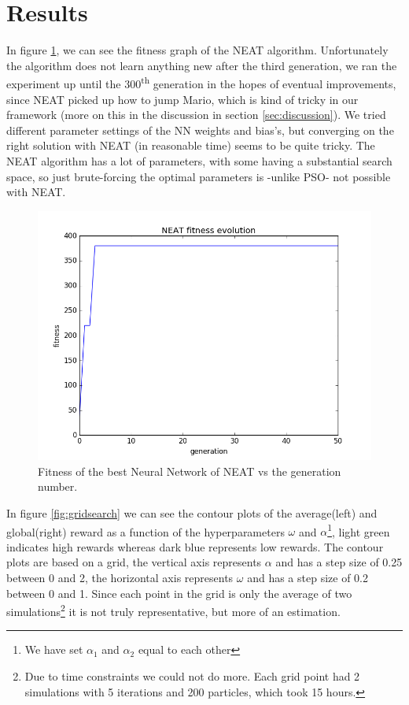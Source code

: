 \documentclass[]{article}
\begin{document}
\section{Results}
In figure \ref{fig:neat_fitness}, we can see the fitness graph of the NEAT algorithm. Unfortunately the algorithm does not learn anything new after the third generation, we ran the experiment up until the 300\textsuperscript{th} generation in the hopes of eventual improvements, since NEAT picked up how to jump Mario, which is kind of tricky in our framework (more on this in the discussion in section \ref{sec:discussion}). We tried different parameter settings of the NN weights and bias's, but converging on the right solution with NEAT (in reasonable time) seems to be quite tricky. The NEAT algorithm has a lot of parameters, with some having a substantial search space, so just brute-forcing the optimal parameters is -unlike PSO- not possible with NEAT.
\begin{figure}[h]
    \centering
    \includegraphics[width=0.8\linewidth]{images/neat_fitness.png}
    \caption{Fitness of the best Neural Network of NEAT vs the generation number.}
    \label{fig:neat_fitness}
\end{figure} \medskip

In figure \ref{fig:gridsearch} we can see the contour plots of the average(left) and global(right) reward as a function of the hyperparameters $\omega$ and $\alpha$\footnote{We have set $\alpha_1$ and $\alpha_2$ equal to each other}, light green indicates high rewards whereas dark blue represents low rewards. The contour plots are based on a grid, the vertical axis represents $\alpha$ and has a step size of 0.25 between 0 and 2, the horizontal axis represents $\omega$ and has a step size of 0.2 between 0 and 1. Since each point in the grid is only the average of two simulations\footnote{Due to time constraints we could not do more. Each grid point had 2 simulations with 5 iterations and 200 particles, which took 15 hours.} it is not truly representative, but more of an estimation. \bigskip
\end{document}
